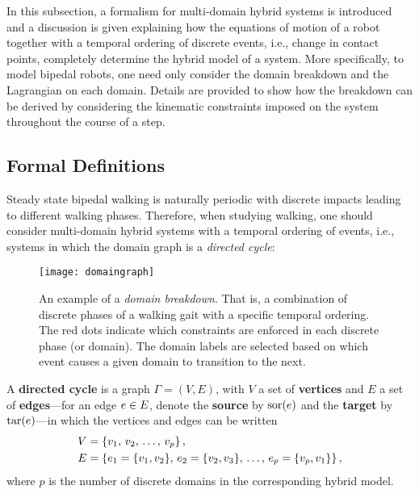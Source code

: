 In this subsection, a formalism for multi-domain hybrid systems is introduced and a
discussion is given explaining how the equations of motion of a robot together
with a temporal ordering of discrete events, i.e., change in contact points,
completely determine the hybrid model of a system.
%
More specifically, to model bipedal robots, one need only consider the domain
breakdown and the Lagrangian on each domain.
%
Details are provided to show how the breakdown can be derived by considering the
kinematic constraints imposed on the system throughout the course of a step.


\subsection{Formal Definitions}


Steady state bipedal walking is naturally periodic with discrete impacts leading
to different walking phases.
%
Therefore, when studying walking, one should consider multi-domain hybrid
systems with a temporal ordering of events, i.e., systems in which the domain
graph is a {\em directed cycle}:

\begin{figure}[t]
  \centering
  \texttt{[image: domaingraph]}
  \caption[An example of a {\em domain breakdown}.]{An example of a {\em domain
      breakdown}.
    That is, a combination of discrete phases of a walking gait with a specific
    temporal ordering. The red dots indicate which constraints are enforced in
    each discrete phase (or domain).
    The domain labels are selected based on which event causes a given domain to
    transition to the next.}
  \label{fig:domaingraph}
\end{figure}

\begin{definition}
  A {\bf directed cycle} is a graph $\Gamma = (V, E)$, with $V$ a set of {\bf
    vertices} and $E$ a set of {\bf edges}---for an edge $e \in E$, denote the
  {\bf source} by $\mathrm{sor}(e)$ and the {\bf target} by $\mathrm{tar}(e)$---in which the
  vertices and edges can be written
  \begin{align}
    \nonumber
    V &= \left\{v_{1}, \, v_{2}, \, \ldots, \, v_{p}\right\},\\
    \label{eq:directedcyclep}
    E &= \left\{e_{1} = \{v_{1}, v_{2}\}, \, e_{2} = \{v_{2}, v_{3}\}, \,
      \ldots, \, e_{p} = \{v_{p}, v_{1}\}\right\},
  \end{align}
  where $p$ is the number of discrete domains in the corresponding hybrid
  model.
\end{definition}

